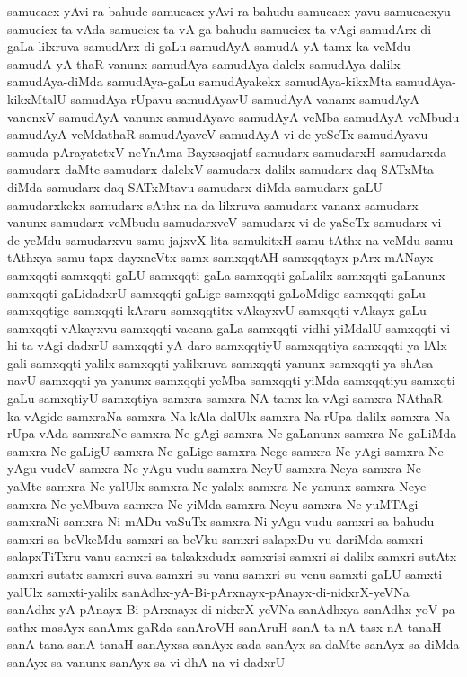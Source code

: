 {samucacx-yAvi-ra-bahude
samucacx-yAvi-ra-bahudu
samucacx-yavu
samucacxyu
samucicx-ta-vAda
samucicx-ta-vA-ga-bahudu
samucicx-ta-vAgi
samudArx-di-gaLa-lilxruva
samudArx-di-gaLu
samudAyA
samudA-yA-tamx-ka-veMdu
samudA-yA-thaR-vanunx
samudAya
samudAya-dalelx
samudAya-dalilx
samudAya-diMda
samudAya-gaLu
samudAyakekx
samudAya-kikxMta
samudAya-kikxMtalU
samudAya-rUpavu
samudAyavU
samudAyA-vananx
samudAyA-vanenxV
samudAyA-vanunx
samudAyave
samudAyA-veMba
samudAyA-veMbudu
samudAyA-veMdathaR
samudAyaveV
samudAyA-vi-de-yeSeTx
samudAyavu
samuda-pArayatetxV-neYnAma-Bayxsaqjatf
samudarx
samudarxH
samudarxda
samudarx-daMte
samudarx-dalelxV
samudarx-dalilx
samudarx-daq-SATxMta-diMda
samudarx-daq-SATxMtavu
samudarx-diMda
samudarx-gaLU
samudarxkekx
samudarx-sAthx-na-da-lilxruva
samudarx-vananx
samudarx-vanunx
samudarx-veMbudu
samudarxveV
samudarx-vi-de-yaSeTx
samudarx-vi-de-yeMdu
samudarxvu
samu-jajxvX-lita
samukitxH
samu-tAthx-na-veMdu
samu-tAthxya
samu-tapx-dayxneVtx
samx
samxqqtAH
samxqqtayx-pArx-mANayx
samxqqti
samxqqti-gaLU
samxqqti-gaLa
samxqqti-gaLalilx
samxqqti-gaLanunx
samxqqti-gaLidadxrU
samxqqti-gaLige
samxqqti-gaLoMdige
samxqqti-gaLu
samxqqtige
samxqqti-kAraru
samxqqtitx-vAkayxvU
samxqqti-vAkayx-gaLu
samxqqti-vAkayxvu
samxqqti-vacana-gaLa
samxqqti-vidhi-yiMdalU
samxqqti-vi-hi-ta-vAgi-dadxrU
samxqqti-yA-daro
samxqqtiyU
samxqqtiya
samxqqti-ya-lAlx-gali
samxqqti-yalilx
samxqqti-yalilxruva
samxqqti-yanunx
samxqqti-ya-shAsa-navU
samxqqti-ya-yanunx
samxqqti-yeMba
samxqqti-yiMda
samxqqtiyu
samxqti-gaLu
samxqtiyU
samxqtiya
samxra
samxra-NA-tamx-ka-vAgi
samxra-NAthaR-ka-vAgide
samxraNa
samxra-Na-kAla-dalUlx
samxra-Na-rUpa-dalilx
samxra-Na-rUpa-vAda
samxraNe
samxra-Ne-gAgi
samxra-Ne-gaLanunx
samxra-Ne-gaLiMda
samxra-Ne-gaLigU
samxra-Ne-gaLige
samxra-Nege
samxra-Ne-yAgi
samxra-Ne-yAgu-vudeV
samxra-Ne-yAgu-vudu
samxra-NeyU
samxra-Neya
samxra-Ne-yaMte
samxra-Ne-yalUlx
samxra-Ne-yalalx
samxra-Ne-yanunx
samxra-Neye
samxra-Ne-yeMbuva
samxra-Ne-yiMda
samxra-Neyu
samxra-Ne-yuMTAgi
samxraNi
samxra-Ni-mADu-vaSuTx
samxra-Ni-yAgu-vudu
samxri-sa-bahudu
samxri-sa-beVkeMdu
samxri-sa-beVku
samxri-salapxDu-vu-dariMda
samxri-salapxTiTxru-vanu
samxri-sa-takakxdudx
samxrisi
samxri-si-dalilx
samxri-sutAtx
samxri-sutatx
samxri-suva
samxri-su-vanu
samxri-su-venu
samxti-gaLU
samxti-yalUlx
samxti-yalilx
sanAdhx-yA-Bi-pArxnayx-pAnayx-di-nidxrX-yeVNa
sanAdhx-yA-pAnayx-Bi-pArxnayx-di-nidxrX-yeVNa
sanAdhxya
sanAdhx-yoV-pa-sathx-masAyx
sanAmx-gaRda
sanAroVH
sanAruH
sanA-ta-nA-tasx-nA-tanaH
sanA-tana
sanA-tanaH
sanAyxsa
sanAyx-sada
sanAyx-sa-daMte
sanAyx-sa-diMda
sanAyx-sa-vanunx
sanAyx-sa-vi-dhA-na-vi-dadxrU
}
